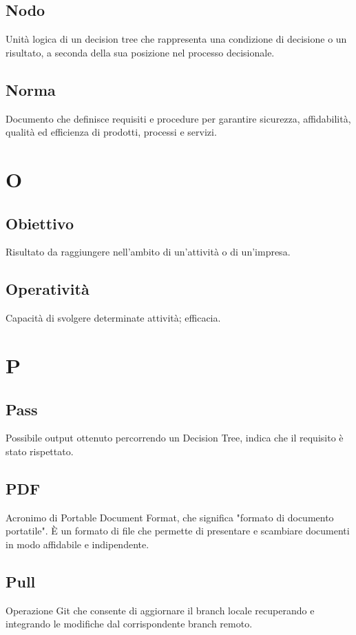 \documentclass[a4paper,12pt]{article}
\begin{document}
          \subsection*{Nodo}
			Unità logica di un decision tree che rappresenta una condizione di decisione o un risultato, a seconda della sua posizione nel processo decisionale.
          \subsection*{Norma}
			Documento che definisce requisiti e procedure per garantire sicurezza, affidabilità, qualità ed efficienza di prodotti, processi e servizi.
        
\newpage
      
        \section{O}
        
          \subsection*{Obiettivo}
			Risultato da raggiungere nell'ambito di un'attività o di un'impresa.
          \subsection*{Operatività}
			Capacità di svolgere determinate attività; efficacia.
        
\newpage
        \section{P}
        
          \subsection*{Pass}
			Possibile output ottenuto percorrendo un Decision Tree, indica che il requisito è stato rispettato.
          \subsection*{PDF}
			Acronimo di Portable Document Format, che significa "formato di documento portatile". È un formato di file che permette di presentare e scambiare documenti in modo affidabile e indipendente.
          \subsection*{Pull}
			Operazione Git che consente di aggiornare il branch locale recuperando e integrando le modifiche dal corrispondente branch remoto.
\end{document}
